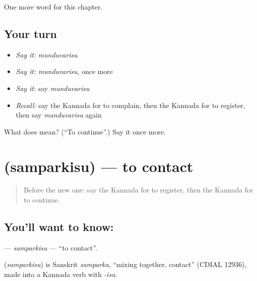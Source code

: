 \begin{grammarlens}[title={What you've built}]
One more word for this chapter.
\end{grammarlens}

\subsection*{Your turn}
\begin{itemize}
\raggedright
  \item \emph{Say it:} \emph{munduvarisu}
  \item \emph{Say it:} \emph{munduvarisu}, once more
  \item \emph{Say it:} say \emph{munduvarisu}
  \item \emph{Recall:} say the Kannada for to complain, then the Kannada for to register, then say \emph{munduvarisu} again
\end{itemize}

\begin{tcolorbox}[breakable,colback=teal!4,colframe=teal!35!black,title={Before you move on}]
What does  mean? (\textquotedblleft{}To continue\textquotedblright{}.) Say it once more.
\end{tcolorbox}
\section[\texorpdfstring{\kn{ಸಂಪರ್ಕಿಸು} (samparkisu)}{ಸಂಪರ್ಕಿಸು (samparkisu)}]{ (samparkisu) — to contact}

\label{lesson:KA-C202-samparkisu}



\begin{quote}
Before the new one: say the Kannada for to register, then the Kannada for to continue.
\end{quote}

\subsection*{You'll want to know: }
\textbf{} — \emph{samparkisu} — \textquotedblleft{}to contact\textquotedblright{}.

\begin{cousinweb}
\textbf{} (\emph{samparkisu}) is Sanskrit \emph{samparka}, \textquotedblleft{}mixing together, contact\textquotedblright{} (CDIAL 12936), made into a Kannada verb with \emph{-isu}.
\end{cousinweb}

